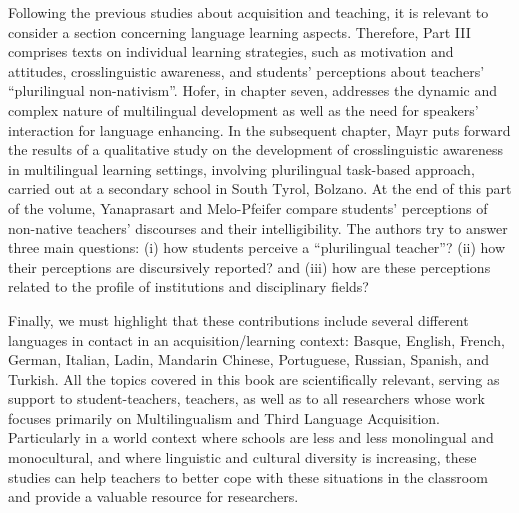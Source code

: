 \documentclass[output=paper]{langsci/langscibook}
\begin{document}
Following the previous studies about acquisition and teaching, it is relevant to consider a section concerning language learning aspects. Therefore, Part III comprises texts on individual learning strategies, such as motivation and attitudes, crosslinguistic awareness, and students’ perceptions about teachers’ “plurilingual non-nativism”. Hofer, in chapter seven, addresses the dynamic and complex nature of multilingual development as well as the need for speakers’ interaction for language enhancing. In the subsequent chapter, Mayr puts forward the results of a qualitative study on the development of crosslinguistic awareness in multilingual learning settings, involving plurilingual task-based approach, carried out at a secondary school in South Tyrol, Bolzano. At the end of this part of the volume, Yanaprasart and Melo-Pfeifer compare students’ perceptions of non-native teachers’ discourses and their intelligibility. The authors try to answer three main questions: (i) how students perceive a “plurilingual teacher”? (ii) how their perceptions are discursively reported? and (iii) how are these perceptions related to the profile of institutions and disciplinary fields?

Finally, we must highlight that these contributions include several different languages in contact in an acquisition/learning context: Basque, English, French, German, Italian, Ladin, Mandarin Chinese, Portuguese, Russian, Spanish, and Turkish. All the topics covered in this book are scientifically relevant, serving as support to student-teachers, teachers, as well as to all researchers whose work focuses primarily on Multilingualism and Third Language Acquisition. Particularly in a world context where schools are less and less monolingual and monocultural, and where linguistic and cultural diversity is increasing, these studies can help teachers to better cope with these situations in the classroom and provide a valuable resource for researchers.

{\sloppy\printbibliography[heading=subbibliography,notkeyword=this]}
\end{document}
